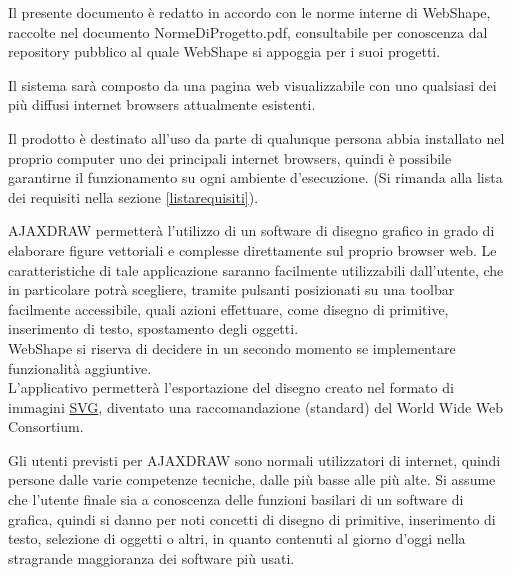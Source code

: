 Il presente documento \`e redatto in accordo con le norme interne di WebShape, raccolte nel documento NormeDiProgetto.pdf, consultabile per conoscenza dal repository pubblico al quale WebShape si appoggia per i suoi progetti.



Il sistema sar\`a composto da una pagina web visualizzabile con uno qualsiasi dei pi\`u diffusi internet browsers attualmente esistenti.

Il prodotto \`e destinato all'uso da parte di qualunque persona abbia installato nel proprio computer uno dei principali internet browsers, quindi \`e possibile garantirne il funzionamento su ogni ambiente d'esecuzione. (Si rimanda alla lista dei requisiti nella sezione \ref{listarequisiti}).

AJAXDRAW permetter\`a l'utilizzo di un software di disegno grafico in grado di elaborare figure vettoriali e complesse direttamente sul proprio browser web. Le caratteristiche di tale applicazione saranno facilmente utilizzabili dall'utente, che in particolare potr\`a scegliere, tramite pulsanti posizionati su una toolbar facilmente accessibile, quali azioni effettuare, come disegno di primitive, inserimento di testo, spostamento degli oggetti.\\
WebShape si riserva di decidere in un secondo momento se implementare funzionalit\`a aggiuntive.\\%
L'applicativo permetter\`a l'esportazione del disegno creato nel formato di immagini \underline{SVG}, diventato una raccomandazione (standard) del World Wide Web Consortium.

\label{definizione_utente}
Gli utenti previsti per AJAXDRAW sono normali utilizzatori di internet, quindi persone dalle varie competenze tecniche, dalle pi\`u basse alle pi\`u alte. Si assume che l'utente finale sia a conoscenza delle funzioni basilari di un software di grafica, quindi si danno per noti concetti di disegno di primitive, inserimento di testo, selezione di oggetti o altri, in quanto contenuti al giorno d'oggi nella stragrande maggioranza dei software pi\`u usati.

